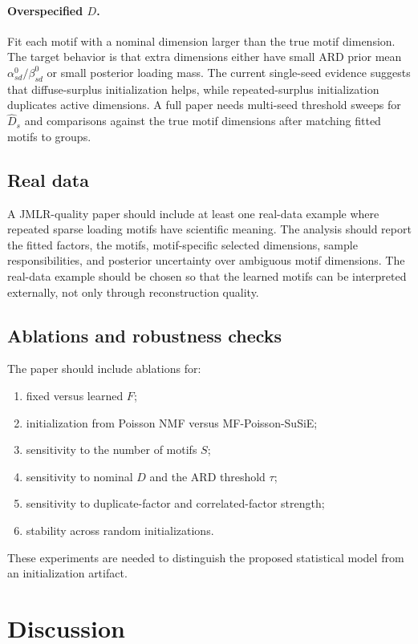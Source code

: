 \documentclass[11pt]{article}
\theoremstyle{definition}
\begin{document}
\paragraph{Overspecified $D$.}
Fit each motif with a nominal dimension larger than the true motif dimension.
The target behavior is that extra dimensions either have small ARD prior mean
$\alpha_{sd}^0/\beta_{sd}^0$ or small posterior loading mass. The current
single-seed evidence suggests that diffuse-surplus initialization helps, while
repeated-surplus initialization duplicates active dimensions. A full paper needs
multi-seed threshold sweeps for $\widehat{D}_s$ and comparisons against the
true motif dimensions after matching fitted motifs to groups.

\subsection{Real data}

A JMLR-quality paper should include at least one real-data example where
repeated sparse loading motifs have scientific meaning. The analysis should
report the fitted factors, the motifs, motif-specific selected dimensions,
sample responsibilities, and posterior uncertainty over ambiguous motif dimensions.
The real-data example should be chosen so that the learned motifs can be
interpreted externally, not only through reconstruction quality.

\subsection{Ablations and robustness checks}

The paper should include ablations for:
\begin{enumerate}
  \item fixed versus learned $F$;
  \item initialization from Poisson NMF versus MF-Poisson-SuSiE;
  \item sensitivity to the number of motifs $S$;
  \item sensitivity to nominal $D$ and the ARD threshold $\tau$;
  \item sensitivity to duplicate-factor and correlated-factor strength;
  \item stability across random initializations.
\end{enumerate}
These experiments are needed to distinguish the proposed statistical model from
an initialization artifact.

\section{Discussion}
\end{document}
